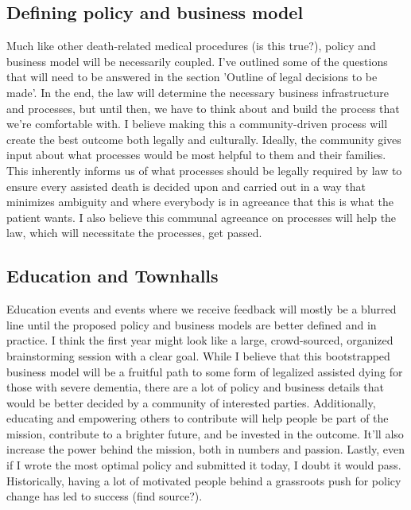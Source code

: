 \documentclass{proposalnsf}
\begin{document}
\subsection{Defining policy and business model}
Much like other death-related medical procedures (is this true?), policy and business model will be necessarily coupled. I've outlined some of the questions that will need to be answered in the section 'Outline of legal decisions to be made'. In the end, the law will determine the necessary business infrastructure and processes, but until then, we have to think about and build the process that we're comfortable with. I believe making this a community-driven process will create the best outcome both legally and culturally. Ideally, the community gives input about what processes would be most helpful to them and their families. This inherently informs us of what processes should be legally required by law to ensure every assisted death is decided upon and carried out in a way that minimizes ambiguity and where everybody is in agreeance that this is what the patient wants. I also believe this communal agreeance on processes will help the law, which will necessitate the processes, get passed.

\subsection{Education and Townhalls}
Education events and events where we receive feedback will mostly be a blurred line until the proposed policy and business models are better defined and in practice. I think the first year might look like a large, crowd-sourced, organized brainstorming session with a clear goal. While I believe that this bootstrapped business model will be a fruitful path to some form of legalized assisted dying for those with severe dementia, there are a lot of policy and business details that would be better decided by a community of interested parties. Additionally, educating and empowering others to contribute will help people be part of the mission, contribute to a brighter future, and be invested in the outcome. It'll also increase the power behind the mission, both in numbers and passion. Lastly, even if I wrote the most optimal policy and submitted it today, I doubt it would pass. Historically, having a lot of motivated people behind a grassroots push for policy change has led to success (find source?).
\end{document}
